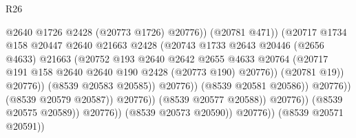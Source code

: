\begin{lexlean}{R26}
\begin{coremodule}
                                                  @2640
                                                  @1726
                                                  @2428
                                                  (@20773 @1726)
                                                  @20776))
                                              (@20781 @471))
                                            (@20717
                                              @1734
                                              @158
                                              @20447
                                              @2640
                                              @21663
                                              @2428
                                              (@20743
                                                @1733
                                                @2643
                                                @20446
                                                (@2656 @4633)
                                                @21663
                                                (@20752
                                                  @193
                                                  @2640
                                                  @2642
                                                  @2655
                                                  @4633
                                                  @20764
                                                  (@20717
                                                    @191
                                                    @158
                                                    @2640
                                                    @2640
                                                    @190
                                                    @2428
                                                    (@20773 @190)
                                                    @20776))
                                                (@20781 @19))
                                              @20776))
                                          (@8539 @20583 @20585))
                                        @20776))
                                    (@8539 @20581 @20586))
                                  @20776))
                              (@8539 @20579 @20587))
                            @20776))
                        (@8539 @20577 @20588))
                      @20776))
                  (@8539 @20575 @20589))
                @20776))
            (@8539 @20573 @20590))
          @20776))
      (@8539 @20571 @20591))

\end{coremodule}
\end{lexlean}
